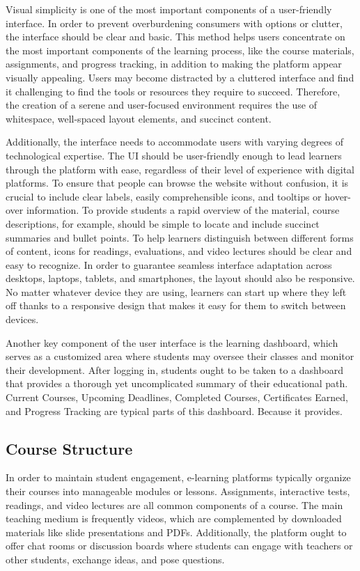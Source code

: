 \documentclass[BTech]{audiss}
\begin{document}
Visual simplicity is one of the most important components of a user-friendly interface. In order to prevent overburdening consumers with options or clutter, the interface should be clear and basic. This method helps users concentrate on the most important components of the learning process, like the course materials, assignments, and progress tracking, in addition to making the platform appear visually appealing. Users may become distracted by a cluttered interface and find it challenging to find the tools or resources they require to succeed. Therefore, the creation of a serene and user-focused environment requires the use of whitespace, well-spaced layout elements, and succinct content.

Additionally, the interface needs to accommodate users with varying degrees of technological expertise. The UI should be user-friendly enough to lead learners through the platform with ease, regardless of their level of experience with digital platforms. To ensure that people can browse the website without confusion, it is crucial to include clear labels, easily comprehensible icons, and tooltips or hover-over information. To provide students a rapid overview of the material, course descriptions, for example, should be simple to locate and include succinct summaries and bullet points. To help learners distinguish between different forms of content, icons for readings, evaluations, and video lectures should be clear and easy to recognize. In order to guarantee seamless interface adaptation across desktops, laptops, tablets, and smartphones, the layout should also be responsive. No matter whatever device they are using, learners can start up where they left off thanks to a responsive design that makes it easy for them to switch between devices.

Another key component of the user interface is the learning dashboard, which serves as a customized area where students may oversee their classes and monitor their development. After logging in, students ought to be taken to a dashboard that provides a thorough yet uncomplicated summary of their educational path. Current Courses, Upcoming Deadlines, Completed Courses, Certificates Earned, and Progress Tracking are typical parts of this dashboard. Because it provides.

\subsection{Course Structure}
In order to maintain student engagement, e-learning platforms typically organize their courses into manageable modules or lessons. Assignments, interactive tests, readings, and video lectures are all common components of a course. The main teaching medium is frequently videos, which are complemented by downloaded materials like slide presentations and PDFs. Additionally, the platform ought to offer chat rooms or discussion boards where students can engage with teachers or other students, exchange ideas, and pose questions.
\end{document}
